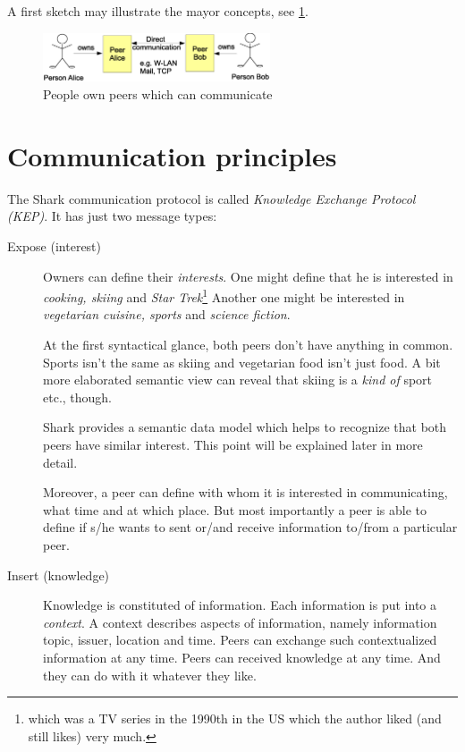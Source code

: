 A first sketch may illustrate the mayor concepts, see \ref{fig:generalConcept}.

\begin{figure}[t]
\centering
\includegraphics[width=0.60\textwidth]{generalConcept.eps}
\caption{People own peers which can communicate}
\label{fig:generalConcept}
\end{figure}

\section{Communication principles}
The Shark communication protocol is called {\it Knowledge Exchange Protocol (KEP)}. It has just two message types:

\begin{description}
    \item[Expose (interest)]
Owners can define their {\it interests}. One might define that he is interested in {\it cooking, skiing} and {\it Star Trek}\footnote{which was a TV series in the 1990th in the US which the author liked (and still likes) very much.} Another one might be interested in {\it vegetarian cuisine, sports} and {\it science fiction}. 

At the first syntactical glance, both peers don't have anything in common. Sports isn't the same as skiing and vegetarian food isn't just food. A bit more elaborated semantic view can reveal that skiing is a {\it kind of} sport etc., though. 

Shark provides a semantic data model which helps to recognize that both peers have similar interest. This point will be explained later in more detail.

Moreover, a peer can define with whom it is interested in communicating, what time and at which place. But most importantly a peer is able to define if s/he wants to sent or/and receive information to/from a particular peer.

    \item[Insert (knowledge)]
Knowledge is constituted of information. Each information is put into a {\it context}. A context describes aspects of information, namely information topic, issuer, location and time. Peers can exchange such contextualized information at any time. Peers can received knowledge at any time. And they can do with it whatever they like.
\end{description}

